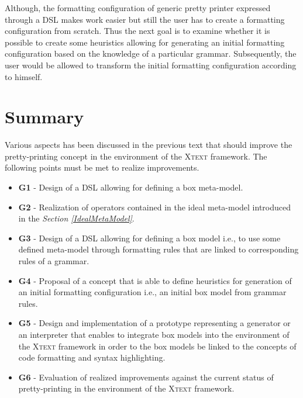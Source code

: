 \documentclass[12pt,notitlepage,a4paper]{report}
\begin{document}
Although, the formatting configuration of generic pretty printer expressed through a DSL makes work easier but still the user has to create a formatting configuration from scratch. Thus the next goal is to examine whether it is possible to create some heuristics allowing for generating an initial formatting configuration based on the knowledge of a particular grammar.  Subsequently, the user would be allowed to transform the initial formatting configuration according to himself.

\section{Summary}

Various aspects has been discussed in the previous text that should improve the pretty-printing concept in the environment of the \textsc{Xtext} framework. The following points must be met to realize improvements.

\begin{itemize}
\item \textbf{G1} - Design of a DSL allowing for defining a box meta-model.
\item \textbf{G2} - Realization of operators contained in the ideal meta-model introduced in the \textit{Section \ref{IdealMetaModel}}.
\item \textbf{G3} - Design of a DSL allowing for defining a box model i.e., to use some defined meta-model through formatting rules that are linked to corresponding rules of a grammar.
\item \textbf{G4} - Proposal of a concept that is able to define heuristics for generation of an initial formatting configuration i.e., an initial box model from grammar rules.
\item \textbf{G5} - Design and implementation of a prototype representing a generator or an interpreter that enables to integrate box models into the environment of the \textsc{Xtext} framework in order to the box models be linked to the concepts of code formatting and syntax highlighting.
\item \textbf{G6} - Evaluation of realized improvements against the current status of pretty-printing in the environment of the \textsc{Xtext} framework.
\end{itemize}
\end{document}
